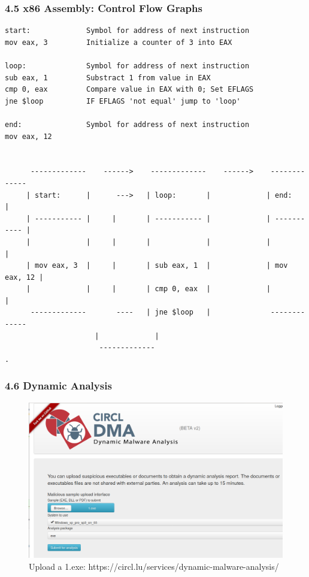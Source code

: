 \begin{frame}[fragile]
  \frametitle{4.5 x86 Assembly: Control Flow Graphs}
  \begin{lstlisting}[basicstyle=\tiny]
start:             Symbol for address of next instruction
mov eax, 3         Initialize a counter of 3 into EAX

loop:              Symbol for address of next instruction
sub eax, 1         Substract 1 from value in EAX
cmp 0, eax         Compare value in EAX with 0; Set EFLAGS
jne $loop          IF EFLAGS 'not equal' jump to 'loop'

end:               Symbol for address of next instruction
mov eax, 12


      -------------    ------>    -------------    ------>    ------------- 
     | start:      |      --->   | loop:       |             | end:        |
     | ----------- |     |       | ----------- |             | ----------- |
     |             |     |       |             |             |             |
     | mov eax, 3  |     |       | sub eax, 1  |             | mov eax, 12 |
     |             |     |       | cmp 0, eax  |             |             |
      -------------       ----   | jne $loop   |              -------------
			         |             | 
			          ------------- 
.
  \end{lstlisting}
\end{frame}


\begin{frame}[fragile]
  \frametitle{4.6 Dynamic Analysis}
    \begin{figure}
        \includegraphics[scale=0.27]{images/dma_1.png}
        \captionsetup{labelformat=empty,labelsep=none}
        \caption[]{\tiny Upload a 1.exe: https://circl.lu/services/dynamic-malware-analysis/}
    \end{figure}
\end{frame}


